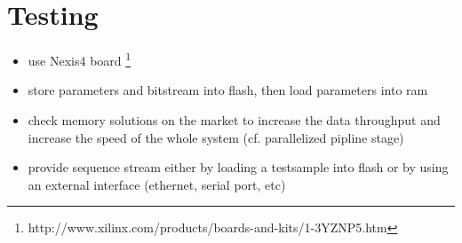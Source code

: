 \documentclass[paper=a4, fontsize=11pt]{scrartcl} %
\begin{document}
\section{Testing}
\begin{itemize}
    \item use Nexis4 board
        \footnote{http://www.xilinx.com/products/boards-and-kits/1-3YZNP5.htm}
    \item store parameters and bitstream into flash, then load parameters into
        ram
    \item check memory solutions on the market to increase the data throughput
        and increase the speed of the whole system (cf. parallelized pipline
        stage)
    \item provide sequence stream either by loading a testsample into flash or
        by using an external interface (ethernet, serial port, etc)
\end{itemize}
\end{document}
